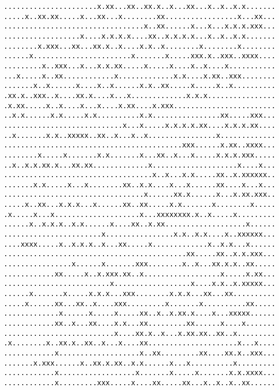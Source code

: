{%
\fontsize{3}{0}%
\selectfont%
\begin{verbatim}......................x.xx...xx..xx.x..x...xx...x..x..x.x.......
.....x..xx.xx.....x...xx...x........xx.................x...xx...
.................................x..xx......x...x...x.x.x.xxx...
..................x....x.x.x.x....xx..x.x.x.x...x..x..x.x.......
........x.xxx...xx...xx.x..x....x.x..x........x........x........
......x.......................x.......x.....xxx.x..xxx..xxxx....
.........x..xxx...x...x.x.xx.....x.....x....x..x....x...........
...x.....x..xx............x.............x.x....x.xx..xxx........
.......x..x......x....x..x......x.x..xx.....x.....x..x..........
.xx.x..xxx..x....xx.x....x...x.............x.x.x................
.x.xx.....x..x....x...x....x.xx....x.xxx........................
..x.x......x.x.....x.x..........x.x................xx.....xxx...
............................x...x.....x.x.x.x.xx....x.x.x.xx....
..x.......x.x..xxxxx..xx..x...x..x................x.............
..........................................xxx......x.xx..xxxx...
........x.....x.......x.x.......x...xx..x...x.....x.x.x.xxx.....
..x..x.x.xx.x...xx.xx.............x....................x....x...
...................................x..x...x.x.....xx..x.xxxxxx..
.......x.x.....x...x........xx..x.x....x...x......xx....x...x...
.................................x......xx.x......x...x.xx.xxx..
.....x..xx...x.x.x...x......xx..xx.....x.x.......x........x.....
.x.....x...x....................x...xxxxxxxx.x..x.....x.........
......x..x.x.x..x.x......x....xx..x.xx...................x......
.......................x................x.x..x.x....x..xxxxxx...
....xxxx.....x..x.x.x..x...xx.....x.............x..x.x...x......
...........................................xx.....xx..x.x.xxx...
................x......x.......xxx........x..x...xx.x.x..xx.....
............xx.....x..x.xxx.xx..x..................x.....x.xx...
.........................x..................x....x.x..x.xxxxx...
......x.......x.....x.x.x...xxx........x.x.x...xx...xx..........
.....x......xx...xx..x....xxx.........x.......x..........xx.....
.............x......x.....x.....xx..x..x.xx.x....x...xxxxx......
............xx..x...xx....x.x...xx.........xx......x....x.......
..........................x....xx.x..x...x.xx.xx..xx..x.........
.x........x..xx.x..xx..x...x....xx.....................x...x....
............x...................x..xx.........xx....xx.x..xxx...
.......x.xxx......x..xx.x.xx..x.x......x...x..........x.........
............x..................x.......x.....x.......x.x.xxxx...
............x.........xxx.....x....xx.....xx...x..x..x..xx......

\end{verbatim}}
